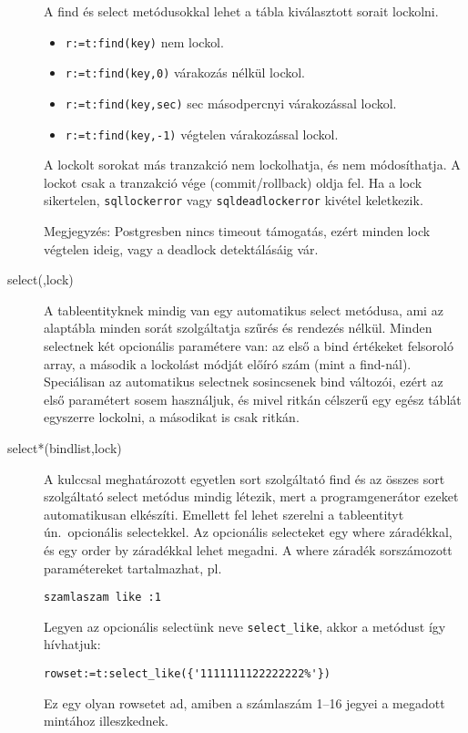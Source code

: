 \begin{description}
    A find és select metódusokkal lehet a tábla kiválasztott sorait 
    lockolni.
    \begin{itemize}
    \item   \verb!r:=t:find(key)! nem lockol.
    \item   \verb!r:=t:find(key,0)! várakozás nélkül lockol. 
    \item   \verb!r:=t:find(key,sec)! sec másodpercnyi várakozással lockol. 
    \item   \verb!r:=t:find(key,-1)! végtelen várakozással lockol. 
    \end{itemize}
    A lockolt sorokat más tranzakció nem lockolhatja, és nem
    módosíthatja. A lockot csak a tranzakció vége (commit/rollback) 
    oldja fel.  Ha a lock sikertelen, \verb!sqllockerror! vagy
    \verb!sqldeadlockerror! kivétel keletkezik.
    
    Megjegyzés: Postgresben nincs timeout támogatás, ezért
    minden lock végtelen ideig, vagy a deadlock detektálásáig vár.

\item[select(,lock)]
    A tableentityknek mindig van egy automatikus select metódusa,
    ami az alaptábla minden sorát szolgáltatja szűrés és rendezés nélkül. 
    Minden selectnek két opcionális paramétere van:
    az első  a bind értékeket felsoroló array,
    a második a lockolást módját előíró szám (mint a find-nál).
    Speciálisan az automatikus selectnek sosincsenek bind változói, 
    ezért az első paramétert sosem használjuk, és mivel ritkán célszerű 
    egy egész táblát egyszerre lockolni, a másodikat is csak ritkán.

\item[select*(bindlist,lock)]
    A kulccsal meghatározott egyetlen sort szolgáltató find 
    és az összes sort szolgáltató select metódus mindig létezik, 
    mert a programgenerátor ezeket automatikusan elkészíti.
    Emellett fel lehet szerelni a tableentityt ún.\
    opcionális selectekkel. Az opcionális selecteket egy
    where záradékkal, és egy order by záradékkal lehet megadni.
    A where záradék sorszámozott paramétereket tartalmazhat, pl.
\begin{verbatim}
szamlaszam like :1
\end{verbatim}
    Legyen az opcionális selectünk neve \verb!select_like!, 
    akkor a metódust így hívhatjuk:
\begin{verbatim}
rowset:=t:select_like({'1111111122222222%'})
\end{verbatim}
    Ez egy olyan rowsetet ad, amiben a számlaszám 1--16 jegyei
    a megadott mintához illeszkednek.


\end{description}
